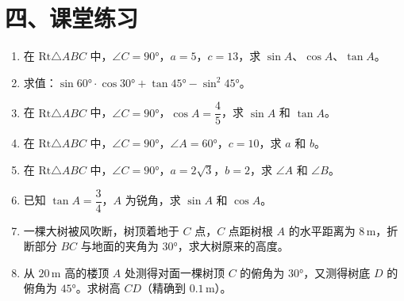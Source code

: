 \documentclass[12pt, a4paper]{ctexart}
\begin{document}
\section*{\textcolor{tipgreen}{四、课堂练习}}

\begin{enumerate}[leftmargin=2em, itemsep=10pt]

  \item 在 $\text{Rt}\triangle ABC$ 中，$\angle C=90°$，$a=5$，$c=13$，求 $\sin A$、$\cos A$、$\tan A$。

  \item 求值：$\sin 60° \cdot \cos 30° + \tan 45° - \sin^2 45°$。

  \item 在 $\text{Rt}\triangle ABC$ 中，$\angle C=90°$，$\cos A = \dfrac{4}{5}$，求 $\sin A$ 和 $\tan A$。

  \item 在 $\text{Rt}\triangle ABC$ 中，$\angle C=90°$，$\angle A=60°$，$c=10$，求 $a$ 和 $b$。

  \item 在 $\text{Rt}\triangle ABC$ 中，$\angle C=90°$，$a=2\sqrt{3}$，$b=2$，求 $\angle A$ 和 $\angle B$。

  \item 已知 $\tan A = \dfrac{3}{4}$，$A$ 为锐角，求 $\sin A$ 和 $\cos A$。

  \item 一棵大树被风吹断，树顶着地于 $C$ 点，$C$ 点距树根 $A$ 的水平距离为 $8\,\text{m}$，折断部分 $BC$ 与地面的夹角为 $30°$，求大树原来的高度。

  \item 从 $20\,\text{m}$ 高的楼顶 $A$ 处测得对面一棵树顶 $C$ 的俯角为 $30°$，又测得树底 $D$ 的俯角为 $45°$。求树高 $CD$（精确到 $0.1\,\text{m}$）。

\end{enumerate}
\end{document}

